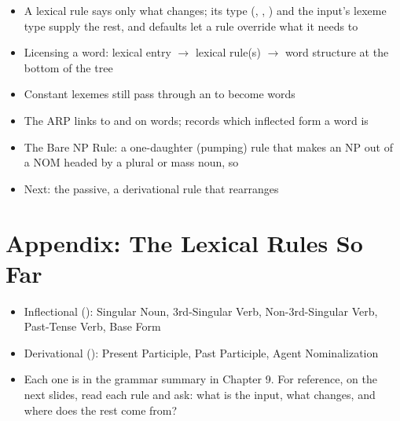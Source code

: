 \documentclass[a4paper,landscape,headrule,footrule]{foils}
\begin{document}
\begin{itemize}
\item A lexical rule says only what changes; its type (,
  , ) and the input's lexeme type supply the
  rest, and defaults let a rule override what it needs to
\item Licensing a word: lexical entry $\rightarrow$ lexical rule(s)
  $\rightarrow$ word structure at the bottom of the tree
\item Constant lexemes still pass through an  to become
  words
\item The ARP links  to  and  on words;
   records which inflected form a word is
\item The Bare NP Rule: a one-daughter (pumping) rule that makes an NP
  out of a NOM headed by a plural or mass noun, so 
\item Next: the passive, a derivational rule that rearranges
\end{itemize}

\section{Appendix: The Lexical Rules So Far}

\begin{itemize}
\item Inflectional (): Singular Noun, 3rd-Singular Verb,
  Non-3rd-Singular Verb, Past-Tense Verb, Base Form
\item Derivational (): Present Participle, Past
  Participle, Agent Nominalization
\item Each one is in the grammar summary in Chapter 9.  For reference, on the next
  slides, read each rule and ask: what is the input, what changes, and
  where does the rest come from?
\end{itemize}

\begin{center}
\end{center}
\end{document}
